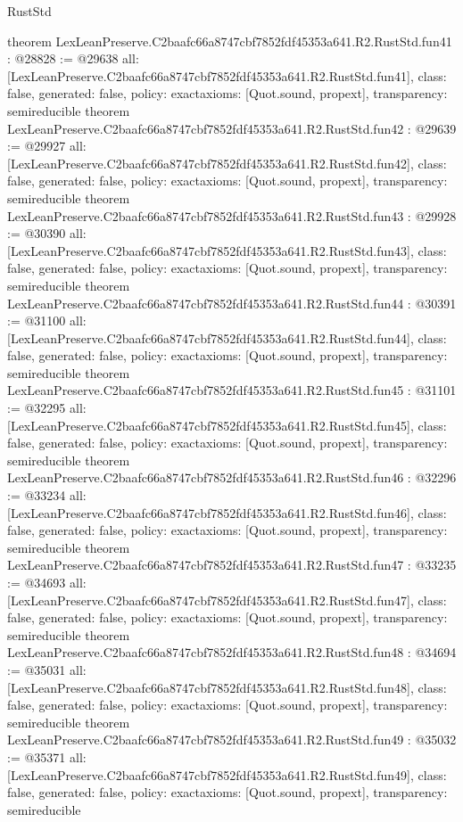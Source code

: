 \begin{lexlean}{RustStd}
\begin{coremodule}
{}
theorem LexLeanPreserve.C2baafc66a8747cbf7852fdf45353a641.R2.RustStd.fun41 : @28828 := @29638 {
  all: [LexLeanPreserve.C2baafc66a8747cbf7852fdf45353a641.R2.RustStd.fun41],
  class: false,
  generated: false,
  policy: exact{axioms: [Quot.sound, propext]},
  transparency: semireducible
}
theorem LexLeanPreserve.C2baafc66a8747cbf7852fdf45353a641.R2.RustStd.fun42 : @29639 := @29927 {
  all: [LexLeanPreserve.C2baafc66a8747cbf7852fdf45353a641.R2.RustStd.fun42],
  class: false,
  generated: false,
  policy: exact{axioms: [Quot.sound, propext]},
  transparency: semireducible
}
theorem LexLeanPreserve.C2baafc66a8747cbf7852fdf45353a641.R2.RustStd.fun43 : @29928 := @30390 {
  all: [LexLeanPreserve.C2baafc66a8747cbf7852fdf45353a641.R2.RustStd.fun43],
  class: false,
  generated: false,
  policy: exact{axioms: [Quot.sound, propext]},
  transparency: semireducible
}
theorem LexLeanPreserve.C2baafc66a8747cbf7852fdf45353a641.R2.RustStd.fun44 : @30391 := @31100 {
  all: [LexLeanPreserve.C2baafc66a8747cbf7852fdf45353a641.R2.RustStd.fun44],
  class: false,
  generated: false,
  policy: exact{axioms: [Quot.sound, propext]},
  transparency: semireducible
}
theorem LexLeanPreserve.C2baafc66a8747cbf7852fdf45353a641.R2.RustStd.fun45 : @31101 := @32295 {
  all: [LexLeanPreserve.C2baafc66a8747cbf7852fdf45353a641.R2.RustStd.fun45],
  class: false,
  generated: false,
  policy: exact{axioms: [Quot.sound, propext]},
  transparency: semireducible
}
theorem LexLeanPreserve.C2baafc66a8747cbf7852fdf45353a641.R2.RustStd.fun46 : @32296 := @33234 {
  all: [LexLeanPreserve.C2baafc66a8747cbf7852fdf45353a641.R2.RustStd.fun46],
  class: false,
  generated: false,
  policy: exact{axioms: [Quot.sound, propext]},
  transparency: semireducible
}
theorem LexLeanPreserve.C2baafc66a8747cbf7852fdf45353a641.R2.RustStd.fun47 : @33235 := @34693 {
  all: [LexLeanPreserve.C2baafc66a8747cbf7852fdf45353a641.R2.RustStd.fun47],
  class: false,
  generated: false,
  policy: exact{axioms: [Quot.sound, propext]},
  transparency: semireducible
}
theorem LexLeanPreserve.C2baafc66a8747cbf7852fdf45353a641.R2.RustStd.fun48 : @34694 := @35031 {
  all: [LexLeanPreserve.C2baafc66a8747cbf7852fdf45353a641.R2.RustStd.fun48],
  class: false,
  generated: false,
  policy: exact{axioms: [Quot.sound, propext]},
  transparency: semireducible
}
theorem LexLeanPreserve.C2baafc66a8747cbf7852fdf45353a641.R2.RustStd.fun49 : @35032 := @35371 {
  all: [LexLeanPreserve.C2baafc66a8747cbf7852fdf45353a641.R2.RustStd.fun49],
  class: false,
  generated: false,
  policy: exact{axioms: [Quot.sound, propext]},
  transparency: semireducible
}
\end{coremodule}
\end{lexlean}
